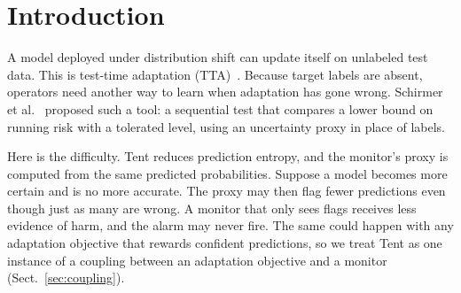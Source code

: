 \documentclass[runningheads]{llncs}
\begin{document}
\section{Introduction}
A model deployed under distribution shift can update itself on unlabeled test data. This is test-time adaptation (TTA)~\cite{Wang2021Tent}. Because target labels are absent, operators need another way to learn when adaptation has gone wrong. Schirmer et al.~\cite{Schirmer2025Monitoring} proposed such a tool: a sequential test that compares a lower bound on running risk with a tolerated level, using an uncertainty proxy in place of labels.

Here is the difficulty. Tent reduces prediction entropy, and the monitor's proxy is computed from the same predicted probabilities. Suppose a model becomes more certain and is no more accurate. The proxy may then flag fewer predictions even though just as many are wrong. A monitor that only sees flags receives less evidence of harm, and the alarm may never fire. The same could happen with any adaptation objective that rewards confident predictions, so we treat Tent as one instance of a coupling between an adaptation objective and a monitor (Sect.~\ref{sec:coupling}).
\end{document}
